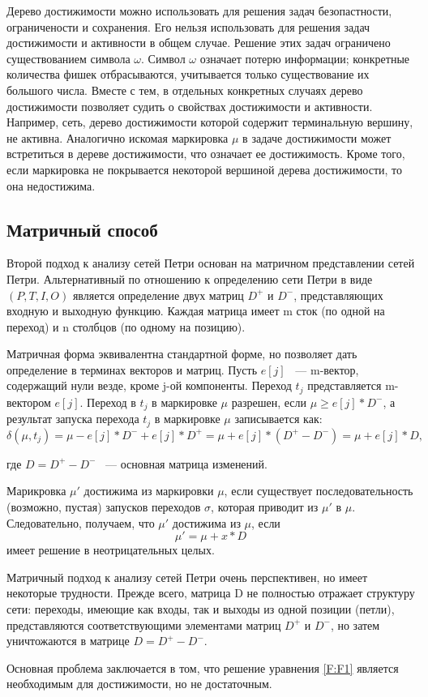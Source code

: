 Дерево достижимости можно использовать для решения задач безопастности, ограничености и сохранения. Его нельзя использовать для решения задач достижимости и активности в общем случае. Решение этих задач ограничено существованием символа $ \omega $. Символ $ \omega $ означает потерю информации; конкретные количества фишек отбрасываются, учитывается только существование их большого числа. \cite{Piterson} Вместе с тем, в отдельных конкретных случаях дерево достижимости позволяет судить о свойствах достижимости и активности. Например, сеть, дерево достижимости которой содержит терминальную вершину, не активна. Аналогично искомая маркировка $ \mu $ в задаче достижимости может встретиться в дереве достижимости, что означает ее достижимость. Кроме того, если маркировка не покрывается некоторой вершиной дерева достижимости, то она недостижима.

\subsection{Матричный способ}

Второй подход к анализу сетей Петри основан на матричном представлении сетей Петри. Альтернативный по отношению к определению сети Петри в виде $ (P, T, I, O) $ является определение двух матриц $ D^{+} $ и $ D^{-} $, представляющих входную и выходную функцию. Каждая матрица имеет m сток (по одной на переход) и n столбцов (по одному на позицию).

Матричная форма эквивалентна стандартной форме, но позволяет дать определение в терминах векторов и матриц. Пусть $ e[j] $ ~--- m-вектор, содержащий нули везде, кроме j-ой компоненты. Переход $ t_{j} $ представляется m-вектором $ e[j] $. Переход в $ t_{j} $ в маркировке $ \mu $ разрешен, если $ \mu \geqslant e[j] * D^{-} $, а результат запуска перехода $ t_{j} $ в маркировке $ \mu $ записывается как:
\begin{equation}
\delta(\mu, t_{j}) = \mu - e[j] * D^{-} + e[j] * D^{+} = \mu + e[j] * (D^{+} - D^{-}) = \mu + e[j] * D,
\end{equation}

где $ D = D^{+} - D^{-} $ ~--- основная матрица изменений.

Марикровка $ \mu' $ достижима из маркировки $ \mu $, если существует последовательность (возможно, пустая) запусков переходов $ \sigma $, которая приводит из $ \mu' $ в $ \mu $. Следовательно, получаем, что $ \mu' $ достижима из $ \mu $, если 
\begin{equation}
\mu' = \mu + x * D
\label{F:F1}
\end{equation}
имеет решение в неотрицательных целых.

Матричный подход к анализу сетей Петри очень перспективен, но имеет некоторые трудности. Прежде всего, матрица D не полностью отражает структуру сети: переходы, имеющие как входы, так и выходы из одной позиции (петли), представляются соответствующими элементами матриц $ D^{+} $ и $ D^{-} $, но затем уничтожаются в матрице $ D = D^{+} - D^{-} $.

Основная проблема заключается в том, что решение уравнения \ref{F:F1} является необходимым для достижимости, но не достаточным.